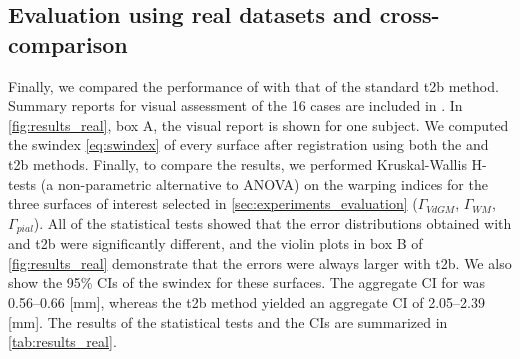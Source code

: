 \subsection{Evaluation using real datasets and cross-comparison}\label{sec:results_hcp}
Finally, we compared the performance of \regseg{} with that of the standard \gls*{t2b}
  method.
Summary reports for visual assessment of the 16 cases are included in .
In \autoref{fig:results_real}, box A, the visual report is shown for one subject.
We computed the \gls*{swindex} \eqref{eq:swindex} of every surface after registration
  using both the \regseg{} and \gls*{t2b} methods.
Finally, to compare the results, we performed Kruskal-Wallis H-tests
  (a non-parametric alternative to ANOVA) on the warping indices for the three surfaces of
  interest selected in \autoref{sec:experiments_evaluation}
  ($\Gamma_{VdGM}$, $\Gamma_{WM}$, $\Gamma_{pial}$).
All of the statistical tests showed that the error distributions obtained with \regseg{} and
  \gls*{t2b} were significantly different, and the violin plots in box B of
  \autoref{fig:results_real} demonstrate that the errors were always larger with \gls*{t2b}.
We also show the 95\% CIs of the \gls*{swindex} for these surfaces.
The aggregate CI for \regseg{} was 0.56--0.66 [mm], whereas the \gls*{t2b} method
  yielded an aggregate CI of 2.05--2.39 [mm].
The results of the statistical tests and the CIs are summarized in \autoref{tab:results_real}.

